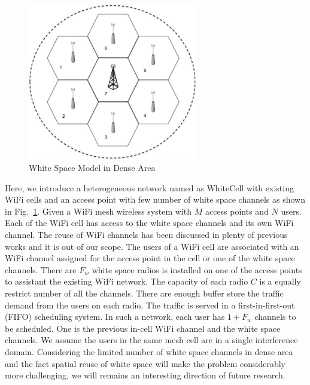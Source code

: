 \begin{figure}
\vspace{-0.0in}
\centering
\includegraphics[width=74mm]{figures/whitecell}
\vspace{-0.1in}
\caption{White Space Model in Dense Area}
\label{fig:systemmodel}
\vspace{-0.1in}
\end{figure}


Here, we introduce a heterogeneous network named as WhiteCell with existing WiFi cells and an access point 
with few number of white space channels as shown in Fig.~\ref{fig:systemmodel}.
Given a WiFi mesh wireless system with $M$ access points and $N$ users.
Each of the WiFi cell has access to the white space channels and its own WiFi channel. The reuse of 
WiFi channels has been discussed in plenty of previous works and it is out of our scope.
The users of a WiFi cell are associated with an WiFi channel assigned for the access point in the cell or one of 
the white space channels. 
There are $F_w$ white space radios is installed on one of the access points to assistant the existing WiFi 
network. 
The capacity of each radio $C$ is a equally restrict number of all the channels. There are enough buffer 
store the traffic demand from the users on each radio. 
The traffic is served in a first-in-first-out (FIFO) scheduling system. 
In such a network, each user has $1+F_w$ channels to be scheduled. One is the previous in-cell WiFi channel 
and the white space channels. 
We assume the users in the same mesh cell are in a single interference domain. 
Considering the limited number of white space channels in dense area and the fact spatial reuse 
of white space will make the problem considerably more challenging, we will remains an interesting 
direction of future research. 


